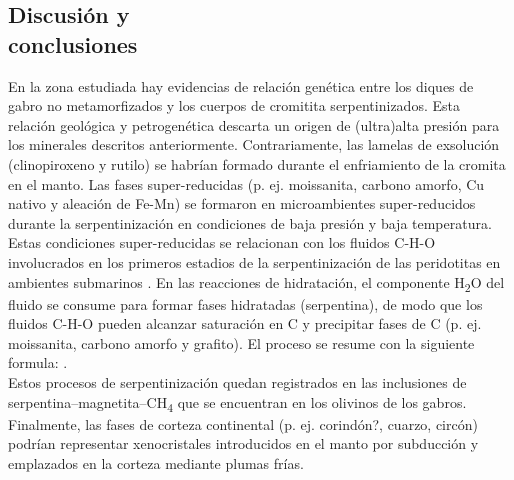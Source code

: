 \documentclass[a4paper,11pt]{article}
\begin{document}
\begin{multicols}{2}
		
		\section{Discusión y \\conclusiones}
		En la zona estudiada hay evidencias de relación genética entre los diques de gabro no metamorfizados y los cuerpos de cromitita serpentinizados. Esta relación geológica y petrogenética descarta un origen de (ultra)alta presión para los minerales descritos anteriormente. Contrariamente, las lamelas de exsolución (clinopiroxeno y rutilo) se habrían formado durante el enfriamiento de la cromita en el manto. Las fases super-reducidas (p. ej. moissanita, carbono amorfo, Cu nativo y aleación de Fe-Mn) se formaron en microambientes super-reducidos durante la serpentinización en condiciones de baja presión y baja temperatura. Estas condiciones super-reducidas se relacionan con los fluidos C-H-O involucrados en los primeros estadios de la serpentinización de las peridotitas en ambientes submarinos \cite{Golubkova}. En las reacciones de hidratación, el componente H\textsubscript{2}O del fluido se consume para formar fases hidratadas (serpentina), de modo que los fluidos C-H-O pueden alcanzar saturación en C y precipitar fases de C (p. ej. moissanita, carbono amorfo y grafito). El proceso se resume con la siguiente formula:
		.
		\\Estos procesos de serpentinización quedan registrados en las inclusiones de serpentina–magnetita–CH\textsubscript{4} que se encuentran en los olivinos de los gabros. Finalmente, las fases de corteza continental (p. ej. corindón?, cuarzo, circón) podrían representar xenocristales introducidos en el manto por subducción y emplazados en la corteza mediante plumas frías.
	\end{multicols}
	
	
	
	
\end{document}

